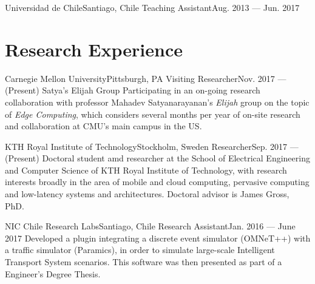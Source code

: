 \documentclass[letterpaper,11pt]{article}
\begin{document}
\resumeSubheading
{Universidad de Chile}{Santiago, Chile}
{Teaching Assistant}{Aug. 2013 --- Jun. 2017}
\resumeItemListStart
{}
\resumeItemListEnd
\resumeSubHeadingListEnd

\section{Research Experience}

\resumeSubHeadingListStart

\resumeSubheading
{Carnegie Mellon University}{Pittsburgh, PA}
{Visiting Researcher}{Nov. 2017 --- (Present)}
\resumeItemListStart
\resumeItem
{Satya's Elijah Group}
{Participating in an on-going research collaboration with professor Mahadev Satyanarayanan's \emph{Elijah} group on the topic of \emph{Edge Computing}, which considers several months per year of on-site research and collaboration at CMU's main campus in the US.}
\resumeItemListEnd

\resumeSubheading
{KTH Royal Institute of Technology}{Stockholm, Sweden}
{Researcher}{Sep. 2017 --- (Present)}
\resumeItemListStart
{}
{Doctoral student amd researcher at the School of Electrical Engineering and Computer Science of KTH Royal Institute of Technology, with research interests broadly in the area of mobile and cloud computing, pervasive computing and low-latency systems and architectures.
Doctoral advisor is James Gross, PhD.}
\resumeItemListEnd

\resumeSubheading
{NIC Chile Research Labs}{Santiago, Chile}
{Research Assistant}{Jan. 2016 --- June 2017}
\resumeItemListStart
{}
{Developed a plugin integrating a discrete event simulator (OMNeT++) with a traffic simulator (Paramics), in order to simulate large-scale Intelligent Transport System scenarios.
This software was then presented as part of a Engineer's Degree Thesis.}
\resumeItemListEnd
\resumeSubHeadingListEnd
\end{document}
